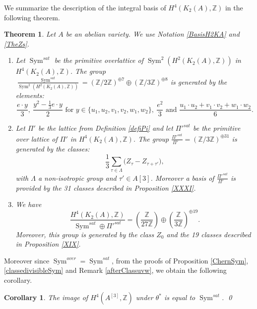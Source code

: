 \documentclass{alggeom}
\DeclareMathOperator{\Sym}{Sym}
\newcommand{\hilb}[1]{^{[#1]}}
\newcommand{\kum}[2]{K_{ #2 }( #1 )}
\newcommand{\X}{\kum{A}{2}}
\newcommand{\Z}{\mathbb{Z}}
\theoremstyle{plain}
\newtheorem{thm}[theorem]{Theorem}
\newtheorem{corollary}[theorem]{Corollary}
\theoremstyle{definition}
\theoremstyle{remark}
\begin{document}
We summarize the description of the integral basis of $H^{4}(K_2(A),\Z)$ in the following theorem.
\begin{thm}\label{integralbasistheorem}
Let $A$ be an abelian variety. We use Notation \ref{BasisH2KA} and \ref{TheZs}. 
\begin{enumerate}
\item 
Let $\Sym^{sat}$ be the primitive overlattice of $\Sym^2\left(H^2\left(\X,\Z\right)\right)$ in $H^4(K_2(A),\Z)$.
The group $\frac{\Sym^{sat}}{\Sym^2\left(H^2\left(\X,\Z\right)\right)}=(\Z/2\Z)^{\oplus 7}\oplus(\Z/3\Z)^{\oplus 8}$ is generated by the elements:
$$\frac{e \cdot y}{3},\ \frac{y^2 - \frac{1}{3} e\cdot y}{2} \text{ for } y\in\{u_1,u_2,v_1,v_2,w_1,w_2\},\ 
\frac{e^2}{3} \text{ and } \frac{u_{1}\cdot u_{2}+v_{1}\cdot v_{2}+w_{1}\cdot w_{2}}{6}.$$
\item
Let $\Pi'$ be the lattice from Definition \ref{defiPi} and let $\Pi'^{sat}$ be the primitive over lattice of $\Pi'$ in $H^4(K_2(A),\Z)$.
The group $\frac{\Pi'^{sat}}{\Pi'\ \ \ }=(\Z/3\Z)^{\oplus 31}$ is generated by the classes:
$$\frac{1}{3}\sum_{\tau\in\Lambda} \Big(Z_{\tau} - Z_{\tau+\tau'}\Big),
$$
with $\Lambda$ a non-isotropic group and $\tau'\in A[3]$. Moreover a basis of $\frac{\Pi'^{sat}}{\Pi'\ \ \ }$ is provided by the 31 classes described in Proposition \ref{XXXI}. 
\item
We have 
$$\frac{H^4(K_2(A),\Z)}{\Sym^{sat}\oplus\Pi'^{sat}}=\left(\frac{\Z}{27\Z}\right)\oplus\left(\frac{\Z}{3\Z}\right)^{\oplus 19}.$$
Moreover, this group is generated by the class $Z_0$ and the 19 classes described in Proposition \ref{XIX}.
\end{enumerate}
\end{thm}
Moreover since $\Sym^{over}=\Sym^{sat}$, from the proofs of Proposition \ref{ChernSym}, \ref{classedivisibleSym} and Remark \ref{afterClassuvw}, we obtain the following corollary.
\begin{corollary}\label{SymSatImage}
The image of $H^4(A\hilb{3},\Z)$ under $\theta^*$ is equal to $\Sym^{sat}$. \qed
\end{corollary}
\end{document}
